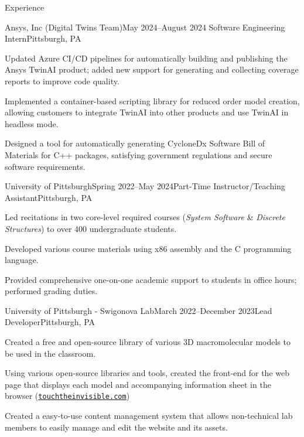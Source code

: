 \begin{rSection}{Experience}
    \begin{rSubsection}{Ansys, Inc (Digital Twins Team)}{May 2024–August 2024}
        {Software Engineering Intern}{Pittsburgh, PA}
        \item Updated Azure CI/CD pipelines for automatically building and publishing the Ansys TwinAI product; added new support for generating and collecting coverage reports to improve code quality.
        \item Implemented a container-based scripting library for reduced order model creation, allowing customers to integrate TwinAI into other products and use TwinAI in headless mode.
        \item Designed a tool for automatically generating CycloneDx Software Bill of Materials for C++ packages, satisfying government regulations and secure software requirements.
    \end{rSubsection}

    \begin{rSubsection}{University of Pittsburgh}{Spring 2022–May 2024}{Part-Time Instructor/Teaching Assistant}{Pittsburgh, PA}
        \item Led recitations in two core-level required courses (\textit{System Software} \& \textit{Discrete Structures}) to over 400 undergraduate students.
        \item Developed various course materials using x86 assembly and the C programming language.
        \item Provided comprehensive one-on-one academic support to students in office hours; performed grading duties.
    \end{rSubsection}

    \begin{rSubsection}{University of Pittsburgh - Swigonova Lab}{March 2022–December 2023}{Lead Developer}{Pittsburgh, PA}
        \item Created a free and open-source library of various 3D macromolecular models to be used in the classroom.
        \item Using various open-source libraries and tools, created the front-end for the web page that displays each model and accompanying information sheet in the browser (\href{https://touchtheinvisible.com}{\nolinkurl{touchtheinvisible.com}})
        \item Created a easy-to-use content management system that allows non-technical lab members to easily manage and edit the website and its assets.
    \end{rSubsection}


\end{rSection}